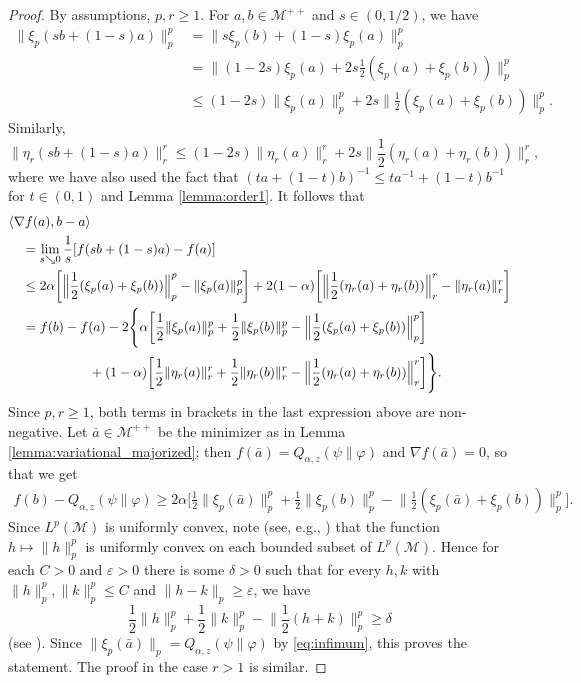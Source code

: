 \documentclass[12pt]{article}
\theoremstyle{definition}
\theoremstyle{remark}
\numberwithin{equation}{section}
\def\Me{\mathcal M}
\def\<{\langle}
\def\>{\rangle}
\begin{document}
\begin{proof} By assumptions, $p,r\ge 1$.  For
$a,b\in \Me^{++}$ and $s\in (0,1/2)$, we have
\begin{align*}
\|\xi_p(sb+(1-s)a)\|_p^p&=\|s\xi_p(b)+(1-s)\xi_p(a)\|_p^p\\
&=\Big\|(1-2s)\xi_p(a)+2s\frac12(\xi_p(a)+\xi_p(b))\Big\|_p^p\\
&\le (1-2s)\|\xi_p(a)\|_p^p+2s\Big\|\frac12(\xi_p(a)+\xi_p(b))\Big\|_p^p.
\end{align*}
Similarly,
\[
\|\eta_r(sb+(1-s)a)\|_r^r\le
(1-2s)\|\eta_r(a)\|_r^r+2s\Big\|\frac12(\eta_r(a)+\eta_r(b))\Big\|_r^r,
\]
where we have also used the fact that $(t a+(1-t)b)^{-1}\le t
a^{-1}+(1-t)b^{-1}$ for $t\in (0,1)$ and Lemma \ref{lemma:order1}. It follows that
\begin{align*}
&\<\nabla f(a),b-a\>\\
&\quad=\lim_{s\searrow0} {1\over s}[ f(sb+(1-s)a)-f(a)]\\
&\quad\le 2\alpha\biggl[\Big\|\frac12(\xi_p(a)+\xi_p(b))\Big\|_p^p-\|\xi_p(a)\|_p^p\biggr]
+2(1-\alpha)\biggl[\Big\|\frac12(\eta_r(a)+\eta_r(b))\Big\|_r^r-\|\eta_r(a)\|_r^r\biggr]\\
&\quad=f(b)-f(a)-2\Biggl\{\alpha\biggl[\frac12 \|\xi_p(a)\|_p^p
+\frac12 \|\xi_p(b)\|_p^p-\Big\|\frac12(\xi_p(a)+\xi_p(b))\Big\|_p^p\biggr]\\
&\qquad\qquad\qquad+(1-\alpha)\biggl[\frac12 \|\eta_r(a)\|_r^r+\frac12 \|\eta_r(b)\|_r^r
-\Big\|\frac12(\eta_r(a)+\eta_r(b))\Big\|_r^r\biggr]\Biggr\}.
\end{align*}
Since $p,r\ge 1$, both terms in brackets in the last expression above are non-negative.
Let $\bar a\in \Me^{++}$ be the minimizer as in Lemma \ref{lemma:variational_majorized};
then $f(\bar a)=Q_{\alpha,z}(\psi\|\varphi)$ and $\nabla f(\bar a)=0$, so that we get
\begin{align*}
f(b)-Q_{\alpha,z}(\psi\|\varphi)\ge 2\alpha\biggl[\frac12 \|\xi_p(\bar a)\|_p^p+\frac12 \|\xi_p(b)\|_p^p
-\Big\|\frac12(\xi_p(\bar a)+\xi_p(b))\Big\|_p^p\biggr].
\end{align*}
Since $L^p(\Me)$ is uniformly convex, note (see, e.g., \cite[Theorem 3.7.7]{zalinescu2002convex})
that the function $h\mapsto \|h\|_p^p$ is uniformly convex on each bounded subset of $L^p(\Me)$.
Hence for each $C>0$ and $\varepsilon>0$ there is some $\delta>0$ such that for every $h,k$
with $\|h\|_p^p,\|k\|_p^p\le C$ and $\|h-k\|_p\ge \varepsilon$, we have
\[
\frac12\|h\|_p^p+\frac12\|k\|_p^p-\Big\|\frac12(h+k)\Big\|_p^p\ge \delta
\]
(see \cite[p.~288, Exercise 3.3]{zalinescu2002convex}). Since $\|\xi_p(\bar
a)\|_p=Q_{\alpha,z}(\psi\|\varphi)$ by \eqref{eq:infimum}, this proves the statement.
The proof in the case $r>1$ is similar. 
\end{proof}
\end{document}
